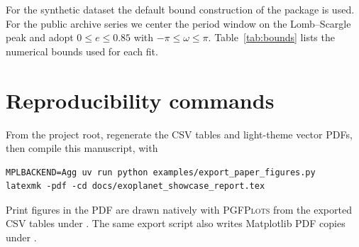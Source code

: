 \documentclass[11pt]{article}
\begin{document}

For the synthetic dataset the default bound construction of the package is
used. For the public archive series we center the period window on the
Lomb--Scargle peak and adopt $0 \le e \le 0.85$ with
$-\pi \le \omega \le \pi$.
Table~\ref{tab:bounds} lists the numerical bounds used for each fit.

\begin{table}[H]
\centering
\caption{Search bounds used for each fit. Units are
$\mathrm{m\,s^{-1}}$ for $K$ and $\gamma$, days for $P$ and $t_0$, and radians
for $\omega$.}
\label{tab:bounds}
\end{table}

\section{Reproducibility commands}
\label{app:repro}

From the project root, regenerate the CSV tables and light-theme vector PDFs,
then compile this manuscript, with
\begin{verbatim}
MPLBACKEND=Agg uv run python examples/export_paper_figures.py
latexmk -pdf -cd docs/exoplanet_showcase_report.tex
\end{verbatim}
Print figures in the PDF are drawn natively with \textsc{PGFPlots} from the
exported CSV tables under . The same export script
also writes Matplotlib PDF copies under .



\end{document}
